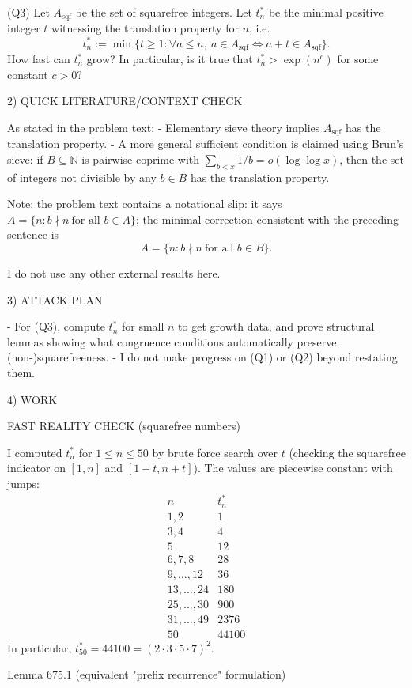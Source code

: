 (Q3) Let $A_{\mathrm{sqf}}$ be the set of squarefree integers. Let $t_n^*$ be the minimal positive integer $t$ witnessing the translation property for $n$, i.e.
\[
 t_n^*:=\min\{t\ge 1: \forall a\le n,\ a\in A_{\mathrm{sqf}}\iff a+t\in A_{\mathrm{sqf}}\}.
\]
How fast can $t_n^*$ grow? In particular, is it true that $t_n^*>\exp(n^c)$ for some constant $c>0$?

2) QUICK LITERATURE/CONTEXT CHECK

As stated in the problem text:
- Elementary sieve theory implies $A_{\mathrm{sqf}}$ has the translation property.
- A more general sufficient condition is claimed using Brun's sieve: if $B\subseteq\mathbb N$ is pairwise coprime with $\sum_{b<x}1/b=o(\log\log x)$, then the set of integers not divisible by any $b\in B$ has the translation property.

Note: the problem text contains a notational slip: it says $A=\{n: b\nmid n\ \text{for all }b\in A\}$; the minimal correction consistent with the preceding sentence is
\[
A=\{n: b\nmid n\ \text{for all }b\in B\}.
\]

I do not use any other external results here.

3) ATTACK PLAN

- For (Q3), compute $t_n^*$ for small $n$ to get growth data, and prove structural lemmas showing what congruence conditions automatically preserve (non-)squarefreeness.
- I do not make progress on (Q1) or (Q2) beyond restating them.

4) WORK

FAST REALITY CHECK (squarefree numbers)

I computed $t_n^*$ for $1\le n\le 50$ by brute force search over $t$ (checking the squarefree indicator on $[1,n]$ and $[1+t,n+t]$). The values are piecewise constant with jumps:
\[
\begin{array}{c|l}
 n & t_n^*\\\hline
 1,2 & 1\\
 3,4 & 4\\
 5 & 12\\
 6,7,8 & 28\\
 9,\dots,12 & 36\\
 13,\dots,24 & 180\\
 25,\dots,30 & 900\\
 31,\dots,49 & 2376\\
 50 & 44100
\end{array}
\]
In particular, $t_{50}^*=44100=(2\cdot 3\cdot 5\cdot 7)^2$.

Lemma 675.1 (equivalent "prefix recurrence" formulation)

